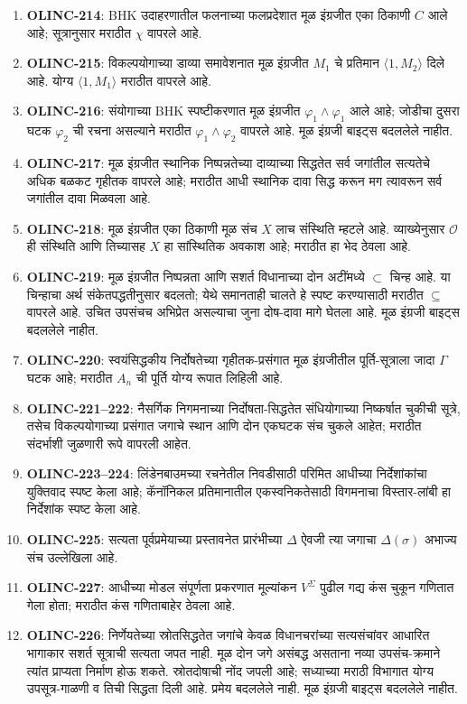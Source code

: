\begin{enumerate}
\item \textbf{OLINC-214}: BHK उदाहरणातील फलनाच्या
फलप्रदेशात मूळ इंग्रजीत एका ठिकाणी \(C\) आले
आहे; सूत्रानुसार मराठीत \(\chi\) वापरले आहे.
\item \textbf{OLINC-215}: विकल्पयोगाच्या डाव्या
समावेशनात मूळ इंग्रजीत \(M_1\) चे प्रतिमान
\(\langle 1,M_2\rangle\) दिले आहे. योग्य
\(\langle 1,M_1\rangle\) मराठीत वापरले आहे.
\item \textbf{OLINC-216}: संयोगाच्या BHK स्पष्टीकरणात
मूळ इंग्रजीत \(\varphi_1\land \varphi_1\) आले आहे;
जोडीचा दुसरा घटक \(\varphi_2\) ची रचना असल्याने
मराठीत \(\varphi_1\land \varphi_2\) वापरले आहे.
मूळ इंग्रजी बाइट्स बदललेले नाहीत.

\item \textbf{OLINC-217}: मूळ इंग्रजीत
स्थानिक निष्पन्नतेच्या दाव्याच्या सिद्धतेत
सर्व जगांतील सत्यतेचे अधिक बळकट गृहीतक
वापरले आहे; मराठीत आधी स्थानिक दावा
सिद्ध करून मग त्यावरून सर्व जगांतील
दावा मिळवला आहे.
\item \textbf{OLINC-218}: मूळ इंग्रजीत एका
ठिकाणी मूळ संच \(X\) लाच संस्थिति म्हटले
आहे. व्याख्येनुसार \(\mathcal O\) ही संस्थिति
आणि तिच्यासह \(X\) हा सांस्थितिक अवकाश आहे;
मराठीत हा भेद ठेवला आहे.
\item \textbf{OLINC-219}: मूळ इंग्रजीत
निष्पन्नता आणि सशर्त विधानाच्या दोन
अटींमध्ये \(\subset\) चिन्ह आहे.
या चिन्हाचा अर्थ संकेतपद्धतीनुसार बदलतो;
येथे समानताही चालते हे स्पष्ट करण्यासाठी
मराठीत \(\subseteq\) वापरले आहे.
उचित उपसंचच अभिप्रेत असल्याचा जुना
दोष-दावा मागे घेतला आहे.
मूळ इंग्रजी बाइट्स बदललेले नाहीत.

\item \textbf{OLINC-220}: स्वयंसिद्धकीय निर्दोषतेच्या
गृहीतक-प्रसंगात मूळ इंग्रजीतील पूर्ति-सूत्राला
जादा \(\Gamma\) घटक आहे; मराठीत \(A_n\)
ची पूर्ति योग्य रूपात लिहिली आहे.
\item \textbf{OLINC-221--222}: नैसर्गिक
निगमनाच्या निर्दोषता-सिद्धतेत संधियोगाच्या
निष्कर्षात चुकीची सूत्रे, तसेच विकल्पयोगाच्या
प्रसंगात जगाचे स्थान आणि दोन एकघटक संच
चुकले आहेत; मराठीत संदर्भाशी जुळणारी
रूपे वापरली आहेत.
\item \textbf{OLINC-223--224}: लिंडेनबाउमच्या
रचनेतील निवडीसाठी परिमित आधीच्या
निर्देशांकांचा युक्तिवाद स्पष्ट केला आहे;
कॅनॉनिकल प्रतिमानातील एकस्वनिकतेसाठी
विगमनाचा विस्तार-लांबी हा निर्देशांक
स्पष्ट केला आहे.
\item \textbf{OLINC-225}: सत्यता पूर्वप्रमेयाच्या
प्रस्तावनेत प्रारंभीच्या \(\Delta\) ऐवजी
त्या जगाचा \(\Delta(\sigma)\) अभाज्य संच
उल्लेखिला आहे.
\item \textbf{OLINC-227}: आधीच्या मोडल
संपूर्णता प्रकरणात मूल्यांकन \(V^\Sigma\)
पुढील गद्य कंस चुकून गणितात गेला होता;
मराठीत कंस गणिताबाहेर ठेवला आहे.
\item \textbf{OLINC-226}: निर्णेयतेच्या
स्रोतसिद्धतेत जगांचे केवळ विधानचरांच्या
सत्यसंचांवर आधारित भागाकार सशर्त
सूत्राची सत्यता जपत नाही. मूळ दोन
जगे असंबद्ध असताना नव्या उपसंच-क्रमाने
त्यांत प्राप्यता निर्माण होऊ शकते.
स्रोतदोषाची नोंद जपली आहे; सध्याच्या
मराठी विभागात योग्य उपसूत्र-गाळणी व
तिची सिद्धता दिली आहे. प्रमेय बदललेले नाही.
मूळ इंग्रजी बाइट्स बदललेले नाहीत.


\end{enumerate}
